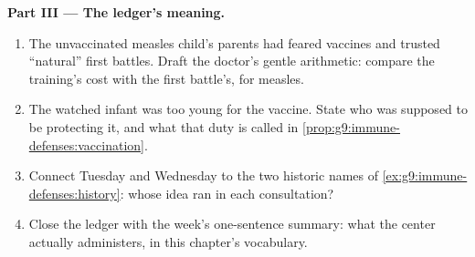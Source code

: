 \begin{problem}
\medskip\noindent\textbf{Part III --- The ledger's
meaning.}
\begin{enumerate}[resume]
  \item The unvaccinated measles child's parents had
        feared vaccines and trusted ``natural''
        first battles. Draft the doctor's gentle
        arithmetic: compare the training's cost with
        the first battle's, for measles.
  \item The watched infant was too young for the
        vaccine. State who was supposed to be
        protecting it, and what that duty is called in
        \cref{prop:g9:immune-defenses:vaccination}.
  \item Connect Tuesday and Wednesday to the two
        historic names of
        \cref{ex:g9:immune-defenses:history}: whose
        idea ran in each consultation?
  \item Close the ledger with the week's one-sentence
        summary: what the center actually administers,
        in this chapter's vocabulary.
\end{enumerate}
\end{problem}
